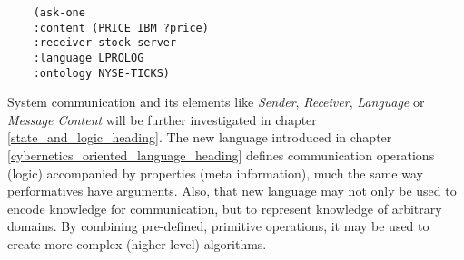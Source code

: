 \begin{scriptsize}
    \begin{verbatim}
    (ask-one
    :content (PRICE IBM ?price)
    :receiver stock-server
    :language LPROLOG
    :ontology NYSE-TICKS)
    \end{verbatim}
\end{scriptsize}

System communication and its elements like \emph{Sender}, \emph{Receiver},
\emph{Language} or \emph{Message Content} will be further investigated in
chapter \ref{state_and_logic_heading}. The new language introduced in chapter
\ref{cybernetics_oriented_language_heading} defines communication operations
(logic) accompanied by properties (meta information), much the same way
performatives have arguments. Also, that new language may not only be used to
encode knowledge for communication, but to represent knowledge of arbitrary
domains. By combining pre-defined, primitive operations, it may be used to
create more complex (higher-level) algorithms.
